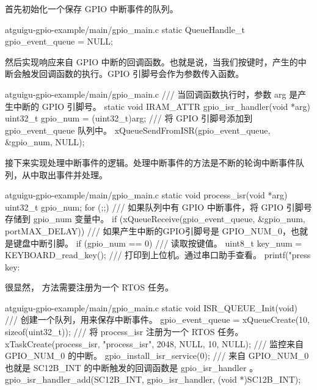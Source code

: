 \documentclass[lang=cn,newtx,10pt,scheme=chinese]{elegantbook}
\begin{document}
首先初始化一个保存 GPIO 中断事件的队列。

\begin{mycode}{atguigu-gpio-example/main/gpio\_main.c}
static QueueHandle_t gpio_event_queue = NULL;
\end{mycode}

然后实现响应来自 GPIO 中断的回调函数。也就是说，当我们按键时，产生的中断会触发回调函数的执行。GPIO 引脚号会作为参数传入函数。

\begin{mycode}{atguigu-gpio-example/main/gpio\_main.c}
/// 当回调函数执行时，参数 arg 是产生中断的 GPIO 引脚号。
static void IRAM_ATTR gpio_isr_handler(void *arg)
{
    uint32_t gpio_num = (uint32_t)arg;
    /// 将 GPIO 引脚号添加到 gpio_event_queue 队列中。
    xQueueSendFromISR(gpio_event_queue, &gpio_num, NULL);
}
\end{mycode}

接下来实现处理中断事件的逻辑。处理中断事件的方法是不断的轮询中断事件队列，从中取出事件并处理。

\begin{mycode}{atguigu-gpio-example/main/gpio\_main.c}
static void process_isr(void *arg)
{
    uint32_t gpio_num;
    for (;;)
    {
        /// 如果队列中有 GPIO 中断事件，将 GPIO 引脚号存储到 gpio_num 变量中。
        if (xQueueReceive(gpio_event_queue, &gpio_num, portMAX_DELAY))
        {
            /// 如果产生中断的GPIO引脚号是 GPIO_NUM_0，也就是键盘中断引脚。
            if (gpio_num == 0)
            {
                /// 读取按键值。
                uint8_t key_num = KEYBOARD_read_key();
                /// 打印到上位机。通过串口助手查看。
                printf("press key: %
            }
        }
    }
}
\end{mycode}

很显然， 方法需要注册为一个 RTOS 任务。

\begin{mycode}{atguigu-gpio-example/main/gpio\_main.c}
static void ISR_QUEUE_Init(void)
{
    /// 创建一个队列，用来保存中断事件。
    gpio_event_queue = xQueueCreate(10, sizeof(uint32_t));
    /// 将 process_isr 注册为一个 RTOS 任务。
    xTaskCreate(process_isr, "process_isr", 2048, NULL, 10, NULL);
    /// 监控来自 GPIO_NUM_0 的中断。
    gpio_install_isr_service(0);
    /// 来自 GPIO_NUM_0 也就是 SC12B_INT 的中断触发的回调函数是 gpio_isr_handler 。
    gpio_isr_handler_add(SC12B_INT, gpio_isr_handler, (void *)SC12B_INT);
}
\end{mycode}
\end{document}

